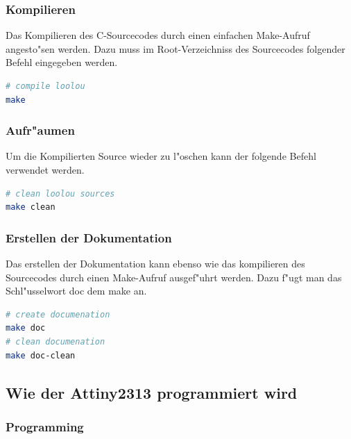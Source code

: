 \subsubsection{Kompilieren}

Das Kompilieren des C-Sourcecodes durch einen einfachen Make-Aufruf angesto"sen werden.
Dazu muss im Root-Verzeichniss des Sourcecodes folgender Befehl eingegeben werden.

\vspace{0.5cm}
\begin{lstlisting}[caption={Compile},language=sh,label=lst:makeall]
# compile loolou
make
\end{lstlisting}
\vspace{0.5cm}

\subsubsection{Aufr"aumen}

Um die Kompilierten Source wieder zu l"oschen kann der folgende Befehl verwendet werden.

\vspace{0.5cm}
\begin{lstlisting}[caption={Clean},language=sh,label=lst:makeclean]
# clean loolou sources
make clean
\end{lstlisting}
\vspace{0.5cm}

\subsubsection{Erstellen der Dokumentation}

Das erstellen der Dokumentation kann ebenso wie das kompilieren des Sourcecodes durch einen Make-Aufruf ausgef"uhrt werden.
Dazu f"ugt man das Schl"usselwort \grqq{}doc\grqq{} dem \grqq{}make\grqq{} an.

\vspace{0.5cm}
\begin{lstlisting}[caption={Create documentation},language=sh,label=lst:builddoc]
# create documenation
make doc
# clean documenation
make doc-clean
\end{lstlisting}
\vspace{0.5cm}


\subsection{Wie der Attiny2313 programmiert wird}
\subsubsection{Programming}


